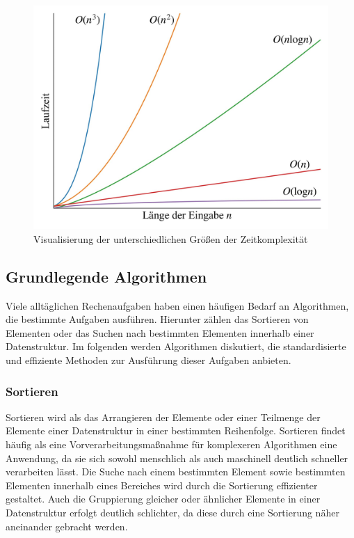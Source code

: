 \begin{figure}[!b]
	\includegraphics[scale=0.17]{Abbildungen/Time_complexities.jpg}
	\centering
	\caption[Zeitkomplexität von Algorithmen]{Visualisierung der unterschiedlichen Größen der Zeitkomplexität}
	\label{fig: time_complexity}
\end{figure}

\subsection{Grundlegende Algorithmen}
Viele alltäglichen Rechenaufgaben haben einen häufigen Bedarf an Algorithmen, die bestimmte Aufgaben ausführen. Hierunter zählen das Sortieren von Elementen oder das Suchen nach bestimmten Elementen innerhalb einer Datenstruktur. Im folgenden werden Algorithmen diskutiert, die standardisierte und effiziente Methoden zur Ausführung dieser Aufgaben anbieten.

\subsubsection{Sortieren}
Sortieren wird als das Arrangieren der Elemente oder einer Teilmenge der Elemente einer Datenstruktur in einer bestimmten Reihenfolge. Sortieren findet häufig als eine Vorverarbeitungsmaßnahme für komplexeren Algorithmen eine Anwendung, da sie sich sowohl menschlich als auch maschinell deutlich schneller verarbeiten lässt. Die Suche nach einem bestimmten Element sowie bestimmten Elementen innerhalb eines Bereiches wird durch die Sortierung effizienter gestaltet. Auch die Gruppierung gleicher oder ähnlicher Elemente in einer Datenstruktur erfolgt deutlich schlichter, da diese durch eine Sortierung näher aneinander gebracht werden. \autocite[153-154]{sanders_sequential_2019}

